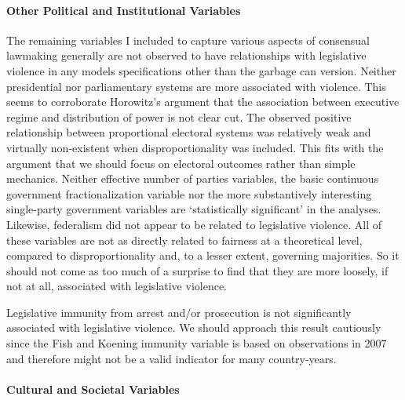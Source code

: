 \documentclass[a4paper]{article}\usepackage{graphicx, color}
\begin{document}
{{\paragraph{Other Political and Institutional Variables}
The remaining variables I included to capture various aspects of consensual lawmaking generally are not observed to have relationships with legislative violence in any models specifications other than the garbage can version.  Neither presidential nor parliamentary systems are more associated with violence. This seems to corroborate Horowitz's \citeyearpar{Horowitz1990} argument that the association between executive regime and distribution of power is not clear cut. The observed positive relationship between proportional electoral systems was relatively weak and virtually non-existent when disproportionality was included. This fits with the argument that we should focus on electoral outcomes rather than simple mechanics. Neither effective number of parties variables, the basic continuous government fractionalization variable nor the more substantively interesting single-party government variables are `statistically significant' in the analyses. Likewise, federalism did not appear to be related to legislative violence. All of these variables are not as directly related to fairness at a theoretical level, compared to disproportionality and, to a lesser extent, governing majorities. So it should not come as too much of a surprise to find that they are more loosely, if not at all, associated with legislative violence.

Legislative immunity from arrest and/or prosecution is not significantly associated with legislative violence. We should approach this result cautiously since the Fish and Koening immunity variable is based on observations in 2007 and therefore might not be a valid indicator for many country-years.

\paragraph{Cultural and Societal Variables}

}}
\end{document}
